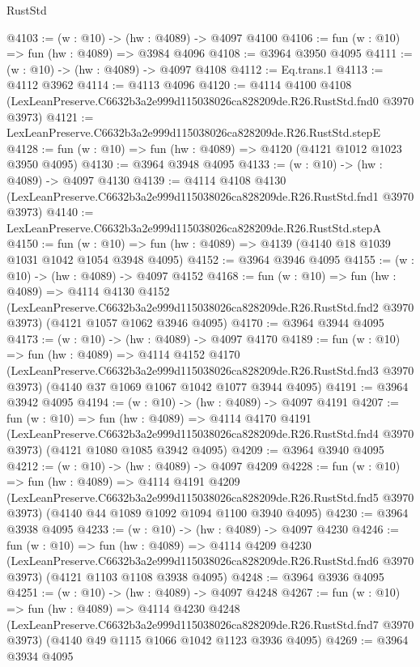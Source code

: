 \begin{lexlean}{RustStd}
\begin{coremodule}
@4103 := (w : @10) -> (hw : @4089) -> @4097 @4100
@4106 := fun (w : @10) => fun (hw : @4089) => @3984 @4096
@4108 := @3964 @3950 @4095
@4111 := (w : @10) -> (hw : @4089) -> @4097 @4108
@4112 := Eq.trans.{1}
@4113 := @4112 @3962
@4114 := @4113 @4096
@4120 := @4114
    @4100
    @4108
    (LexLeanPreserve.C6632b3a2e999d115038026ca828209de.R26.RustStd.fnd0 @3970 @3973)
@4121 := LexLeanPreserve.C6632b3a2e999d115038026ca828209de.R26.RustStd.stepE
@4128 := fun (w : @10) => fun (hw : @4089) => @4120 (@4121 @1012 @1023 @3950 @4095)
@4130 := @3964 @3948 @4095
@4133 := (w : @10) -> (hw : @4089) -> @4097 @4130
@4139 := @4114
    @4108
    @4130
    (LexLeanPreserve.C6632b3a2e999d115038026ca828209de.R26.RustStd.fnd1 @3970 @3973)
@4140 := LexLeanPreserve.C6632b3a2e999d115038026ca828209de.R26.RustStd.stepA
@4150 := fun (w : @10) => fun (hw : @4089) => @4139 (@4140 @18 @1039 @1031 @1042 @1054 @3948 @4095)
@4152 := @3964 @3946 @4095
@4155 := (w : @10) -> (hw : @4089) -> @4097 @4152
@4168 := fun (w : @10) =>
  fun (hw : @4089) =>
  @4114
    @4130
    @4152
    (LexLeanPreserve.C6632b3a2e999d115038026ca828209de.R26.RustStd.fnd2 @3970 @3973)
    (@4121 @1057 @1062 @3946 @4095)
@4170 := @3964 @3944 @4095
@4173 := (w : @10) -> (hw : @4089) -> @4097 @4170
@4189 := fun (w : @10) =>
  fun (hw : @4089) =>
  @4114
    @4152
    @4170
    (LexLeanPreserve.C6632b3a2e999d115038026ca828209de.R26.RustStd.fnd3 @3970 @3973)
    (@4140 @37 @1069 @1067 @1042 @1077 @3944 @4095)
@4191 := @3964 @3942 @4095
@4194 := (w : @10) -> (hw : @4089) -> @4097 @4191
@4207 := fun (w : @10) =>
  fun (hw : @4089) =>
  @4114
    @4170
    @4191
    (LexLeanPreserve.C6632b3a2e999d115038026ca828209de.R26.RustStd.fnd4 @3970 @3973)
    (@4121 @1080 @1085 @3942 @4095)
@4209 := @3964 @3940 @4095
@4212 := (w : @10) -> (hw : @4089) -> @4097 @4209
@4228 := fun (w : @10) =>
  fun (hw : @4089) =>
  @4114
    @4191
    @4209
    (LexLeanPreserve.C6632b3a2e999d115038026ca828209de.R26.RustStd.fnd5 @3970 @3973)
    (@4140 @44 @1089 @1092 @1094 @1100 @3940 @4095)
@4230 := @3964 @3938 @4095
@4233 := (w : @10) -> (hw : @4089) -> @4097 @4230
@4246 := fun (w : @10) =>
  fun (hw : @4089) =>
  @4114
    @4209
    @4230
    (LexLeanPreserve.C6632b3a2e999d115038026ca828209de.R26.RustStd.fnd6 @3970 @3973)
    (@4121 @1103 @1108 @3938 @4095)
@4248 := @3964 @3936 @4095
@4251 := (w : @10) -> (hw : @4089) -> @4097 @4248
@4267 := fun (w : @10) =>
  fun (hw : @4089) =>
  @4114
    @4230
    @4248
    (LexLeanPreserve.C6632b3a2e999d115038026ca828209de.R26.RustStd.fnd7 @3970 @3973)
    (@4140 @49 @1115 @1066 @1042 @1123 @3936 @4095)
@4269 := @3964 @3934 @4095

\end{coremodule}
\end{lexlean}
